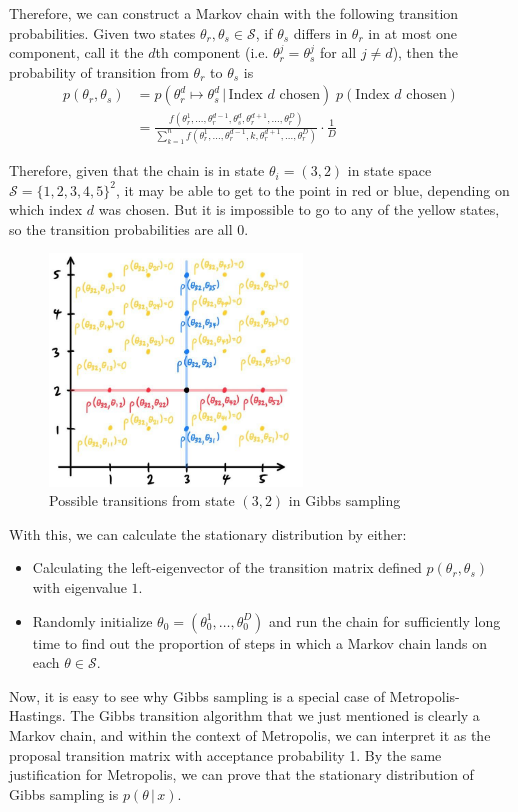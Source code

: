 \documentclass{article}
\begin{document}
  Therefore, we can construct a Markov chain with the following transition probabilities. Given two states $\theta_r, \theta_s \in \mathcal{S}$, if $\theta_s$ differs in $\theta_r$ in at most one component, call it the $d$th component (i.e. $\theta_r^j = \theta_s^j$ for all $j \neq d$), then the probability of transition from $\theta_r$ to $\theta_s$ is
  \begin{align*}
    p(\theta_r, \theta_s) & = p(\theta_r^d \mapsto \theta_{s}^d\,|\, \text{Index } d \text{ chosen})\; p (\text{Index } d \text{ chosen}) \\
    & = \frac{f(\theta_r^1, \ldots, \theta_r^{d-1}, \theta_s^d, \theta_r^{d+1}, \ldots, \theta_r^D)}{\sum_{k=1}^n f(\theta_r^1, \ldots, \theta_r^{d-1}, k, \theta_r^{d+1}, \ldots, \theta_r^D)} \cdot \frac{1}{D}
  \end{align*}

  Therefore, given that the chain is in state $\theta_i = (3, 2)$ in state space $\mathcal{S} = \{1, 2, 3, 4, 5\}^2$, it may be able to get to the point in red or blue, depending on which index $d$ was chosen. But it is impossible to go to any of the yellow states, so the transition probabilities are all $0$.

  \begin{figure}[H]
    \centering
    \includegraphics[width=0.6\textwidth]{img/prob_0.jpg}
    \caption{Possible transitions from state $(3,2)$ in Gibbs sampling}
  \end{figure}

  With this, we can calculate the stationary distribution by either:
  \begin{itemize}
    \item Calculating the left-eigenvector of the transition matrix defined $p(\theta_r, \theta_s)$ with eigenvalue $1$.
    \item Randomly initialize $\theta_0 = (\theta_0^1, \ldots, \theta_0^D)$ and run the chain for sufficiently long time to find out the proportion of steps in which a Markov chain lands on each $\theta \in \mathcal{S}$.
  \end{itemize}

  Now, it is easy to see why Gibbs sampling is a special case of Metropolis-Hastings. The Gibbs transition algorithm that we just mentioned is clearly a Markov chain, and within the context of Metropolis, we can interpret it as the proposal transition matrix with acceptance probability 1. By the same justification for Metropolis, we can prove that the stationary distribution of Gibbs sampling is $p(\theta\,|\,x)$.
\end{document}

